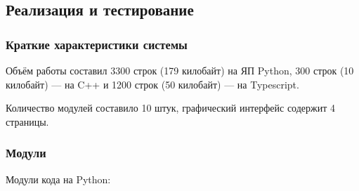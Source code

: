 \documentclass[../document.tex]{subfiles}
\begin{document}
	\subsection{Реализация и тестирование}
	\subsubsection{Краткие характеристики системы}
	\par Объём работы составил 3300 строк (179 килобайт) на ЯП Python, 300 строк (10 килобайт) --- на C++ и 1200 строк (50 килобайт) --- на Typescript.
	\par Количество модулей составило 10 штук, графический интерфейс содержит 4 страницы.
	\subsubsection{Модули}
	\par Модули кода на Python:
\end{document}
